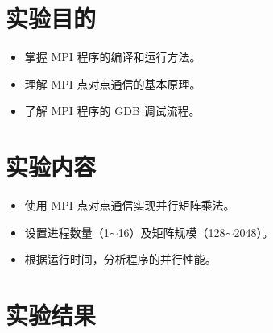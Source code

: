 \documentclass{SYSUReport}
\date{2025年3月26日}
\begin{document}
\cover
\thispagestyle{empty} %
\clearpage



\section{实验目的}
\begin{itemize}
   \item 掌握 MPI 程序的编译和运行方法。
    \item 理解 MPI 点对点通信的基本原理。
    \item 了解 MPI 程序的 GDB 调试流程。
\end{itemize}

\section{实验内容}
\begin{itemize}
   \item 使用 MPI 点对点通信实现并行矩阵乘法。
    \item 设置进程数量（1$\sim$16）及矩阵规模（128$\sim$2048）。
    \item 根据运行时间，分析程序的并行性能。
\end{itemize}


\section{实验结果}
\end{document}
